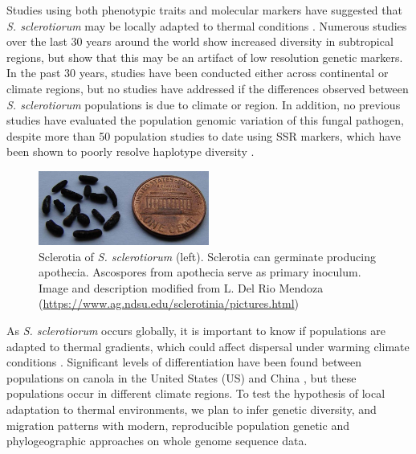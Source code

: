 \documentclass[12pt,letterpaper]{article}
\begin{document}
Studies using both phenotypic traits and molecular markers have suggested that \textit{S. sclerotiorum} may be locally adapted to thermal conditions \citep{huang1991temperature,carbone2001microbial}.
Numerous studies over the last 30 years around the world show increased diversity in subtropical regions, but \citet{lehner2017sclerotinia} show that this may be an artifact of low resolution genetic markers.
In the past 30 years, studies have been conducted either across continental or climate regions, but no studies have addressed if the differences observed between \textit{S. sclerotiorum} populations is due to climate or region.
In addition, no previous studies have evaluated the population genomic variation
of this fungal pathogen, despite more than 50 population studies to date using
SSR markers, which have been shown to poorly resolve haplotype diversity \citep{lehner2017independently}. 


\begin{figure}
  \centering
  \includegraphics[width=0.5\textwidth]{figure/sclerotia.jpg}
  \caption{Sclerotia of \textit{S. sclerotiorum} (left). Sclerotia can germinate producing apothecia. Ascospores from apothecia serve as primary inoculum. Image and description modified from L. Del Rio Mendoza (\url{https://www.ag.ndsu.edu/sclerotinia/pictures.html})}
  \label{fig:sclerotia}
\end{figure}

As \textit{S. sclerotiorum} occurs globally, it is important to know if populations are adapted to thermal gradients, which could affect dispersal under warming climate conditions \citep{bolton2006sclerotinia,lehner2017sclerotinia,croll2016genetic}.
Significant levels of differentiation have been found between populations on canola in the United States (US) and China \citep{attanayake2013sclerotinia}, but these populations occur in different climate regions.
To test the hypothesis of local adaptation to thermal environments, we plan to infer genetic diversity, and migration patterns with modern, reproducible population genetic and phylogeographic approaches on whole genome sequence data. 
\end{document}
